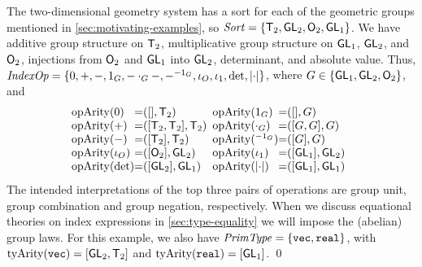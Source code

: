 \begin{example*}
  \label{ex:two-dim-geo-operations}
  The two-dimensional geometry system has a sort for each of the
  geometric groups mentioned in \autoref{sec:motivating-examples}, so
  $\mathit{Sort} = \{\mathsf{T}_2, \mathsf{GL}_2, \mathsf{O}_2, \mathsf{GL}_1 \}$.
  We have additive group structure on $\mathsf{T}_2$, multiplicative
  group structure on $\mathsf{GL}_1$, $\mathsf{GL}_2$, and $\mathsf{O}_2$,
  injections from $\mathsf{O}_2$ and $\mathsf{GL}_1$ into $\mathsf{GL}_2$,
  determinant, and absolute value. Thus, $\mathit{IndexOp} = \{ 0, +, -,
  1_G, -\cdot_G-, -^{-1_G}, \iota_O, \iota_1, \det, \lvert \cdot \rvert \}$, where
  $G \in \{\mathsf{GL}_1, \mathsf{GL}_2, \mathsf{O}_2\}$, and
  \begin{displaymath}
    \begin{array}{@{}l@{\hspace{0em}=\hspace{0em}}l@{\hspace{0.5em}}l@{\hspace{0em}=\hspace{0em}}l}
      \indexOpArity(0) & ([], \SynTransl{2}) &
      \indexOpArity(1_G) & ([], G) \\
      \indexOpArity(+) & ([\SynTransl{2}, \SynTransl{2}], \SynTransl{2}) &
      \indexOpArity(\cdot_G) & ([G,G],G) \\
      \indexOpArity(-) & ([\SynTransl{2}], \SynTransl{2}) &
      \indexOpArity(^{-1_G}) & ([G], G) \\
      \indexOpArity(\iota_O) & ([\SynOrth{2}], \SynGL{2}) &
      \indexOpArity(\iota_1) & ([\SynGL{1}], \SynGL{2}) \\
      \indexOpArity(\det) & ([\SynGL{2}], \SynGL{1}) &
      \indexOpArity(\abs{\cdot}) & ([\SynGL{1}], \SynGL{1})
    \end{array}
  \end{displaymath}
  The intended interpretations of the top three pairs of operations
  are group unit, group combination and group negation,
  respectively. 
  When we discuss equational theories on index expressions 
in \autoref{sec:type-equality} 
we will impose the (abelian) group laws. For this example, 
we also have $\mathit{PrimType} = \{ \textup{\texttt{vec}},
  \textup{\texttt{real}} \}$, with $\mathrm{tyArity}(\textup{\texttt{vec}}) =
           [\mathsf{GL}_2, \mathsf{T}_2]$ and
           $\mathrm{tyArity}(\textup{\texttt{real}}) = [\mathsf{GL}_1]$.
\qed
\end{example*}


